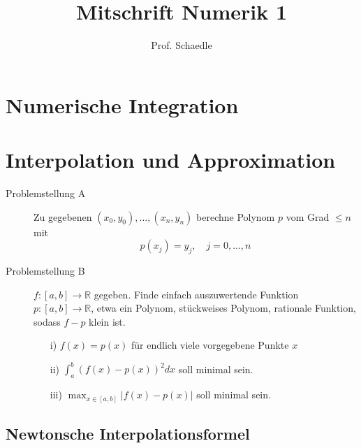 \documentclass[12pt]{article}
\author{Prof. Schaedle}
\title{Mitschrift Numerik 1 }
\theoremstyle{break}
\begin{document}
\maketitle

\newpage

\tableofcontents
\newpage

\section{Numerische Integration}


\section{Interpolation und Approximation}

\begin{description}
  \item[Problemstellung A]
    Zu gegebenen $(x_0, y_0), ...,(x_n, y_n)$ berechne Polynom $p$ vom Grad $\leq n$ mit $$p(x_j) = y_j, \quad j=0,...,n$$
  
  \item[Problemstellung B]
    $f:[a,b] \rightarrow \mathbb{R}$ gegeben. Finde einfach auszuwertende Funktion $p: [a,b] \rightarrow \mathbb{R}$, etwa ein Polynom, stückweises Polynom, rationale Funktion, sodass $f-p$ klein ist.
    \begin{enumerate}
      \item[i)] $f(x)=p(x)$ für endlich viele vorgegebene Punkte $x$
      \item[ii)] $\int_a^b (f(x)-p(x))^2 dx$ soll minimal sein.
      \item[iii)] $\max_{x \in [a,b]} \vert f(x) -p(x) \vert$ soll minimal sein.
    \end{enumerate}
\end{description}

\subsection{Newtonsche Interpolationsformel}
\end{document}
